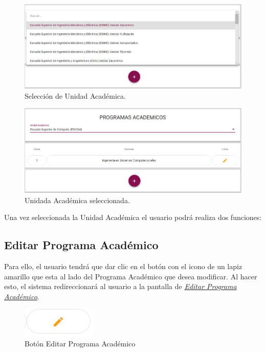             \begin{figure}[H]
                \centering
                \hypertarget{prede}{\includegraphics[width=0.7\linewidth]{images/SP3/seleccion}}
                \caption{Selección de Unidad Académica.}
                \label{predes}
            \end{figure}

            \begin{figure}[H]
                \centering
                \hypertarget{predess}{\includegraphics[width=0.7\linewidth]{images/SP3/otraua}}
                \caption{Unidada Académica seleccionada.}
                \label{predess}
            \end{figure}

         Una vez seleccionada la Unidad Académica el usuario  podrá realiza dos funciones:

	    \subsection{Editar Programa Académico}

        	Para ello, el usuario tendrá que dar clic en el botón con el icono de un lapiz amarillo que esta al lado del Programa Académico que desea modificar. Al hacer esto, el sistema redireccionará al usuario a la pantalla de \hyperlink{editarpa}{\textit{Editar Programa Académico}}.

        	\begin{figure}[H]
        		\centering
        		\hypertarget{editar}{\includegraphics[width=0.7\linewidth]{images/SP3/BtnEditar}}
        		\caption{Botón Editar Programa Académico}
        		\label{editar}
        	\end{figure}

